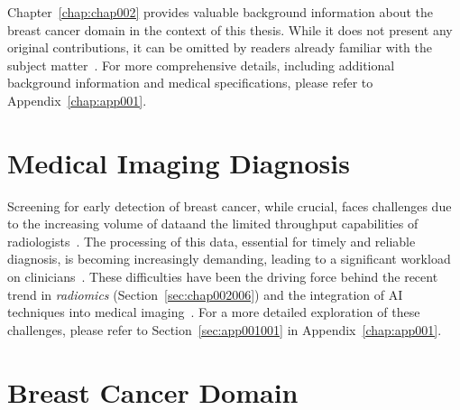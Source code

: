 \clearpage
\label{chap:chap002}

Chapter~\ref{chap:chap002} provides valuable background information about the breast cancer domain in the context of this thesis.
While it does not present any original contributions, it can be omitted by readers already familiar with the subject matter~\cite{doi:10.1148/ryai.2020190208}.
For more comprehensive details, including additional background information and medical specifications, please refer to Appendix~\ref{chap:app001}.

\section{Medical Imaging Diagnosis}
\label{sec:chap002001}

\textcolor{revised}{Screening for early detection of breast cancer, while crucial, faces challenges due to the increasing volume of data\footnotemark[4] and the limited throughput capabilities of radiologists~\cite{McKinney2020}.
The processing of this data, essential for timely and reliable diagnosis, is becoming increasingly demanding, leading to a significant workload on clinicians~\cite{HANNA20181709}.
These difficulties have been the driving force behind the recent trend in {\it radiomics} (Section~\ref{sec:chap002006}) and the integration of \ac{AI} techniques into medical imaging~\cite{doi:10.1148/radiol.2015151169}.
For a more detailed exploration of these challenges, please refer to Section~\ref{sec:app001001} in Appendix~\ref{chap:app001}.}


\section{Breast Cancer Domain}
\label{sec:chap002002}

